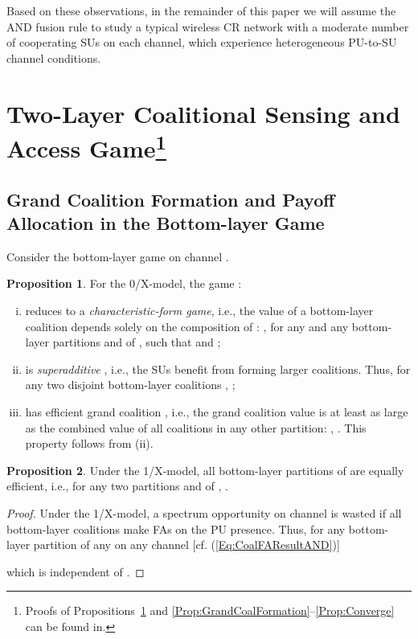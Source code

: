 \documentclass[journal,draftclsnofoot,onecolumn]{IEEEtran}
\theoremstyle{definition}
\newtheorem{Prop}{Proposition}
\begin{document}
Based on these observations, in the remainder of this paper we will assume the AND fusion rule to study a typical wireless CR network with a moderate number of cooperating SUs on each channel, which experience heterogeneous PU-to-SU channel conditions.

\section[Two-Layer Coalitional Sensing and Access Game]{Two-Layer Coalitional Sensing and Access Game\footnote{Proofs of Propositions~\ref{Prop:Characteristic} and \ref{Prop:GrandCoalFormation}--\ref{Prop:Converge} can be found in\cite{YLuCISS}.}}\label{Sec:Game}

\subsection{Grand Coalition Formation and Payoff Allocation in the Bottom-layer Game}\label{SubSec:BottomSol}
Consider the bottom-layer game  on channel .

\begin{Prop}\label{Prop:Characteristic}
For the 0/X-model, the game : 
\begin{enumerate}[(i)]
	\item reduces to a \emph{characteristic-form game}, i.e., the value of a bottom-layer coalition  depends solely on the composition of  \cite{CoalGameSurvey}: , for any  and any bottom-layer partitions  and  of , such that   and  ; 

\item is \emph{superadditive} \cite{CoalGameSurvey}, i.e., the SUs benefit from forming larger coalitions. Thus, for any two disjoint bottom-layer coalitions , ; 

\item has efficient grand coalition \cite{Efficiency}, i.e., the grand coalition value is at least as large as the combined value of all coalitions in any other partition: , . This property follows from (ii).
\end{enumerate}
\end{Prop}

\begin{Prop} \label{Prop:EqualEfficient}
Under the 1/X-model, all bottom-layer partitions of  are equally efficient, i.e., for any two partitions  and  of , .
\end{Prop}
\begin{proof}
Under the 1/X-model, a spectrum opportunity on channel  is wasted if all bottom-layer coalitions make FAs on the PU presence. Thus, for any bottom-layer partition  of any  on any channel  [cf. (\ref{Eq:CoalFAResultAND})]

which is independent of .
\end{proof}
\end{document}
